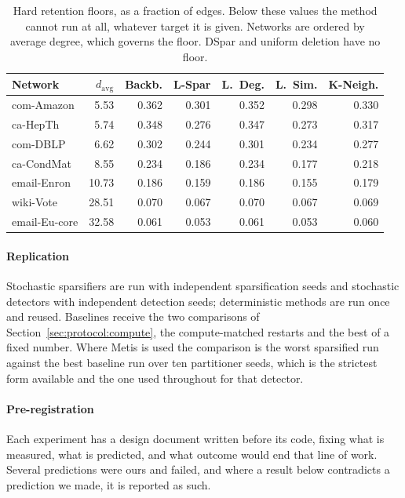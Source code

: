 \begin{table}[t]
\centering
\caption{Hard retention floors, as a fraction of edges. Below these values the
method cannot run at all, whatever target it is given. Networks are ordered by
average degree, which governs the floor. DSpar and uniform deletion have no
floor.}
\label{tab:floors}
\footnotesize
\setlength{\tabcolsep}{3pt}
\begin{tabular}{@{}lrrrrrr@{}}
\toprule
Network & $d_{\mathrm{avg}}$ & Backb. & L-Spar & L.\ Deg. & L.\ Sim. &
K-Neigh.\\
\midrule
com-Amazon    &  5.53 & 0.362 & 0.301 & 0.352 & 0.298 & 0.330\\
ca-HepTh      &  5.74 & 0.348 & 0.276 & 0.347 & 0.273 & 0.317\\
com-DBLP      &  6.62 & 0.302 & 0.244 & 0.301 & 0.234 & 0.277\\
ca-CondMat    &  8.55 & 0.234 & 0.186 & 0.234 & 0.177 & 0.218\\
email-Enron   & 10.73 & 0.186 & 0.159 & 0.186 & 0.155 & 0.179\\
wiki-Vote     & 28.51 & 0.070 & 0.067 & 0.070 & 0.067 & 0.069\\
email-Eu-core & 32.58 & 0.061 & 0.053 & 0.061 & 0.053 & 0.060\\
\bottomrule
\end{tabular}
\end{table}

\paragraph{Replication}
Stochastic sparsifiers are run with independent sparsification seeds and
stochastic detectors with independent detection seeds; deterministic methods are
run once and reused. Baselines receive the two comparisons of
Section~\ref{sec:protocol:compute}, the compute-matched restarts and the best of
a fixed number. Where Metis is used the comparison is the worst sparsified run
against the best baseline run over ten partitioner seeds, which is the strictest
form available and the one used throughout for that detector.

\paragraph{Pre-registration}
Each experiment has a design document written before its code, fixing what is
measured, what is predicted, and what outcome would end that line of work.
Several predictions were ours and failed, and where a result below contradicts a
prediction we made, it is reported as such.
